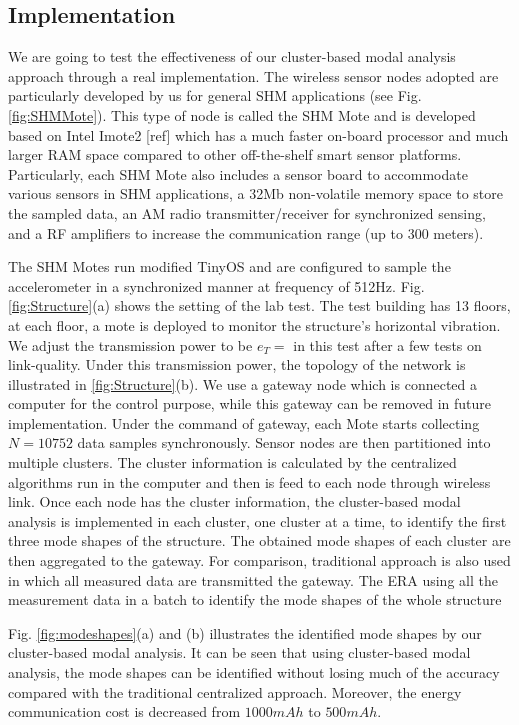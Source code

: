 \subsection{Implementation}
We are going to test the effectiveness of our cluster-based modal analysis approach through a real implementation. The wireless sensor nodes adopted are particularly developed by us for general SHM applications (see Fig.\ref{fig:SHMMote}). This type of node is called the SHM Mote and is developed based on Intel Imote2 [ref] which has a much faster on-board processor and much larger RAM space compared to other off-the-shelf smart sensor platforms. Particularly, each SHM Mote also includes a sensor board to accommodate various sensors in SHM applications, a 32Mb non-volatile memory space to store the sampled data, an AM radio transmitter/receiver for synchronized sensing, and a RF amplifiers to increase the communication range (up to 300 meters). 

The SHM Motes run modified TinyOS and are configured to sample the accelerometer in a synchronized manner at frequency of 512Hz. Fig. \ref{fig:Structure}(a) shows the setting of the lab test. The test building has 13 floors, at each floor, a mote is deployed to monitor the structure's horizontal vibration. We adjust the transmission power to be \(e_T =\) in this test after a few tests on link-quality. Under this transmission power, the topology of the network is illustrated in \ref{fig:Structure}(b). We use a gateway node which is connected a computer for the control purpose, while this gateway can be removed in future implementation. Under the command of gateway, each Mote starts collecting \(N = 10752\) data samples synchronously. Sensor nodes are then partitioned into multiple clusters. The cluster information is calculated by the centralized algorithms run in the computer and then is feed to each node through wireless link. Once each node has the cluster information, the cluster-based modal analysis is implemented in each cluster, one cluster at a time, to identify the first three mode shapes of the structure.  The obtained mode shapes of each cluster are then aggregated to the gateway.  For comparison, traditional approach is also used in which all measured data are transmitted the gateway. The ERA using all the measurement data in a batch to identify the mode shapes of the whole structure

Fig. \ref{fig:modeshapes}(a) and (b) illustrates the identified mode shapes by our cluster-based modal analysis. It can be seen that using cluster-based modal analysis, the mode shapes can be identified without losing much of the accuracy compared with the traditional centralized approach. Moreover, the energy communication cost is decreased from \( 1000mAh\) to \(500mAh\).
